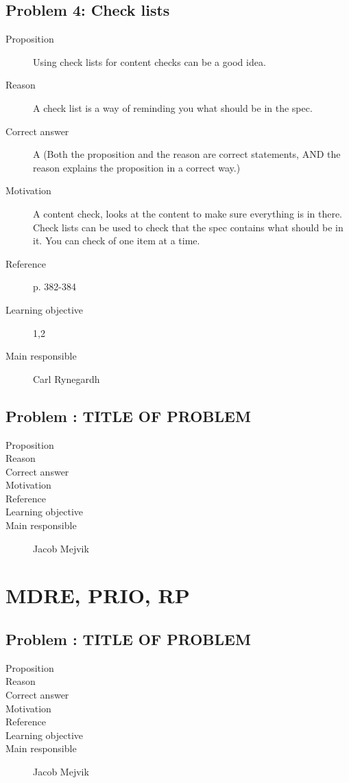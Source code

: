\documentclass[10pt,a4paper]{article}
\begin{document}
\subsection*{Problem 4: Check lists}
\begin{description}
\item[Proposition] Using check lists for content checks can be a good idea.
\item[Reason] A check list is a way of reminding you what should be in the spec.
\item[Correct answer] A (Both the proposition and the reason are correct statements,
AND the reason explains the proposition in a correct way.)
\item[Motivation] A content check, looks at the content to make sure everything is in there. Check lists can be used to check that the spec contains what should be in it. You can check of one item at a time.
\item[Reference] p. 382-384
\item[Learning objective] 1,2
\item[Main responsible] Carl Rynegardh
\end{description}

\subsection*{Problem : TITLE OF PROBLEM}
\begin{description}
\item[Proposition] 
\item[Reason] 
\item[Correct answer]
\item[Motivation]
\item[Reference]
\item[Learning objective]
\item[Main responsible] Jacob Mejvik
\end{description}

\section*{MDRE, PRIO, RP}
\subsection*{Problem : TITLE OF PROBLEM}
\begin{description}
\item[Proposition] 
\item[Reason] 
\item[Correct answer]
\item[Motivation]
\item[Reference]
\item[Learning objective]
\item[Main responsible] Jacob Mejvik
\end{description}
\end{document}
